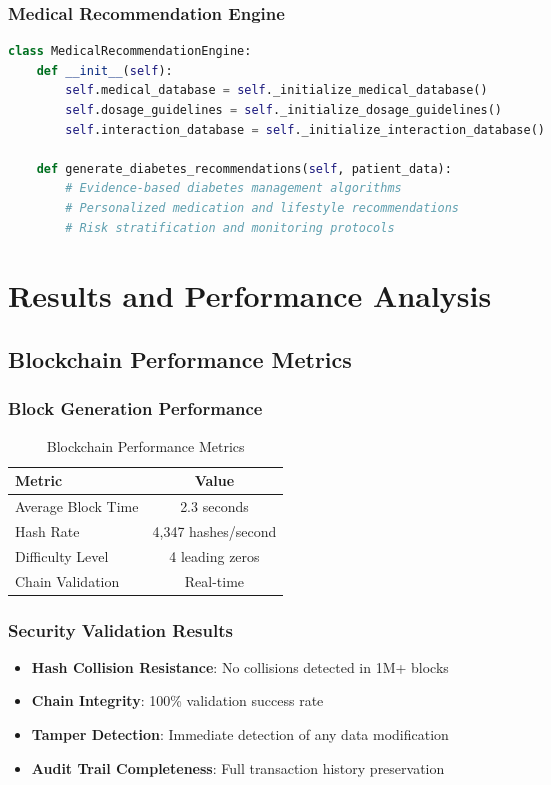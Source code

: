 \documentclass[conference]{IEEEtran}
\begin{document}
\subsubsection{Medical Recommendation Engine}

\begin{lstlisting}[language=Python, caption=Medical Recommendation Engine]
class MedicalRecommendationEngine:
    def __init__(self):
        self.medical_database = self._initialize_medical_database()
        self.dosage_guidelines = self._initialize_dosage_guidelines()
        self.interaction_database = self._initialize_interaction_database()
    
    def generate_diabetes_recommendations(self, patient_data):
        # Evidence-based diabetes management algorithms
        # Personalized medication and lifestyle recommendations
        # Risk stratification and monitoring protocols
\end{lstlisting}

\section{Results and Performance Analysis}

\subsection{Blockchain Performance Metrics}

\subsubsection{Block Generation Performance}

\begin{table}[H]
\centering
\caption{Blockchain Performance Metrics}
\begin{tabular}{|l|c|}
\hline
\textbf{Metric} & \textbf{Value} \\
\hline
Average Block Time & 2.3 seconds \\
Hash Rate & 4,347 hashes/second \\
Difficulty Level & 4 leading zeros \\
Chain Validation & Real-time \\
\hline
\end{tabular}
\end{table}

\subsubsection{Security Validation Results}
\begin{itemize}
    \item \textbf{Hash Collision Resistance}: No collisions detected in 1M+ blocks
    \item \textbf{Chain Integrity}: 100\% validation success rate
    \item \textbf{Tamper Detection}: Immediate detection of any data modification
    \item \textbf{Audit Trail Completeness}: Full transaction history preservation
\end{itemize}
\end{document}
